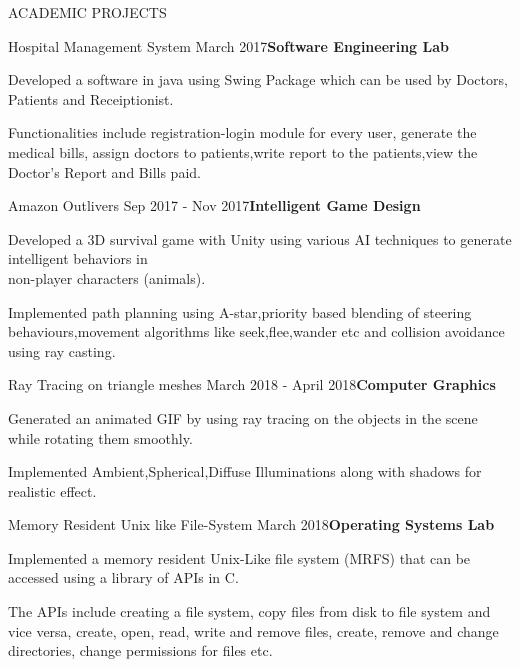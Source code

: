 \documentclass{resume} %
\begin{document}
\begin{rSection}{ACADEMIC PROJECTS}

\begin{rSubsection}{Hospital Management System} {March 2017}{\textbf{Software Engineering Lab}}{}

\item Developed a software in java using Swing Package which can be used by Doctors, Patients and Receiptionist.
\item Functionalities include  registration-login module for every user, generate the medical bills, assign doctors to patients,write report to the patients,view the Doctor's Report and Bills paid.
\end{rSubsection}  


\begin{rSubsection}{Amazon Outlivers} {Sep 2017 - Nov 2017}{\textbf{Intelligent Game Design}}{}

\item Developed a 3D survival game with Unity using various AI techniques to generate intelligent behaviors in \\non-player characters (animals).
\item Implemented path planning using A-star,priority based blending of steering behaviours,movement algorithms like seek,flee,wander etc and collision avoidance using ray casting.
\end{rSubsection}  




\begin{rSubsection}{Ray Tracing on triangle meshes} {March 2018 - April 2018}{\textbf{Computer Graphics }}{}

\item Generated an animated GIF by using ray tracing on the objects in the scene while rotating them smoothly.
\item Implemented Ambient,Spherical,Diffuse Illuminations along with shadows for realistic effect.
\end{rSubsection}  



\begin{rSubsection}{Memory Resident Unix like File-System } {March 2018}{\textbf{Operating Systems Lab}}{}

\item Implemented a memory resident Unix-Like file system (MRFS) that can be accessed using a library of APIs in C.
\item The APIs include creating a file system, copy files from disk to file system and vice versa, create, open, read, write and remove files, create,
remove and change directories, change permissions for files etc.
\end{rSubsection}  


\end{rSection}
\end{document}
